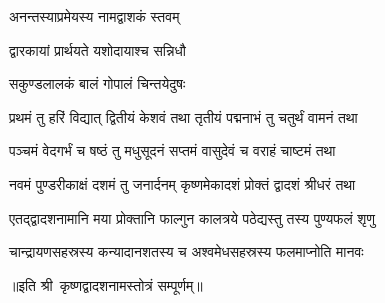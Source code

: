 
{अनन्तस्याप्रमेयस्य नामद्वाशकं स्तवम्}

{द्वारकायां प्रार्थयते यशोदायाश्च सन्निधौ}

{सकुण्डलालकं बालं गोपालं चिन्तयेदुषः}

\twolineshloka
{प्रथमं तु हरिं विद्यात् द्वितीयं केशवं तथा}
{तृतीयं पद्मनाभं तु चतुर्थं वामनं तथा}%

\twolineshloka
{पञ्चमं वेदगर्भं च षष्ठं तु मधुसूदनं}
{सप्तमं वासुदेवं च वराहं चाष्टमं तथा}%

\twolineshloka
{नवमं पुण्डरीकाक्षं दशमं तु जनार्दनम्}
{कृष्णमेकादशं प्रोक्तं द्वादशं श्रीधरं तथा}%

\twolineshloka
{एतद्द्वादशनामानि मया प्रोक्तानि फाल्गुन}
{कालत्रये पठेद्यस्तु तस्य पुण्यफलं शृणु}%

\twolineshloka
{चान्द्रायणसहस्रस्य कन्यादानशतस्य च}
{अश्वमेधसहस्रस्य फलमाप्नोति मानवः}%

॥इति श्री~कृष्णद्वादशनामस्तोत्रं सम्पूर्णम्‌॥